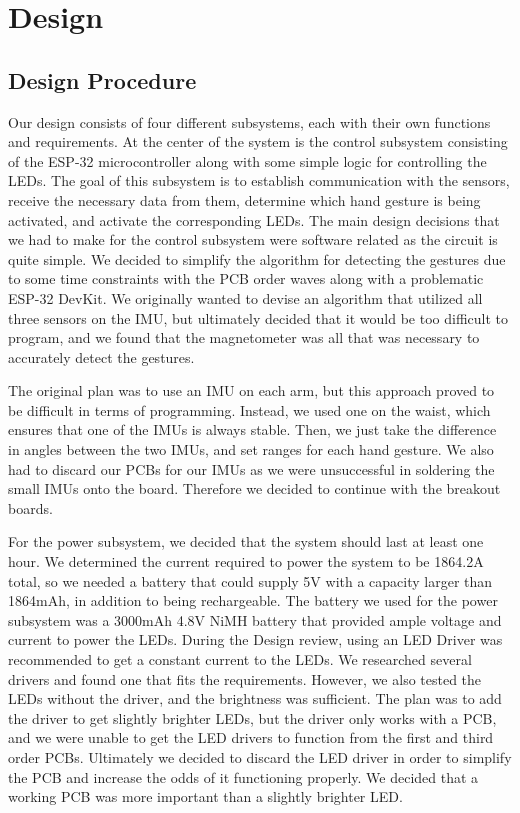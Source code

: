 \section{Design}

\subsection{Design Procedure}
Our design consists of four different subsystems, each with their own functions and requirements. At the center of the system is the control subsystem consisting of the ESP-32 microcontroller along with some simple logic for controlling the LEDs. The goal of this subsystem is to establish communication with the sensors, receive the necessary data from them, determine which hand gesture is being activated, and activate the corresponding LEDs. The main design decisions that we had to make for the control subsystem were software related as the circuit is quite simple. We decided to simplify the algorithm for detecting the gestures due to some time constraints with the PCB order waves along with a problematic ESP-32 DevKit. We originally wanted to devise an algorithm that utilized all three sensors on the IMU, but ultimately decided that it would be too difficult to program, and we found that the magnetometer was all that was necessary to accurately detect the gestures.

The original plan was to use an IMU on each arm, but this approach proved to be difficult in terms of programming. Instead, we used one on the waist, which ensures that one of the IMUs is always stable. Then, we just take the difference in angles between the two IMUs, and set ranges for each hand gesture. We also had to discard our PCBs for our IMUs as we were unsuccessful in soldering the small IMUs onto the board. Therefore we decided to continue with the breakout boards. 

For the power subsystem, we decided that the system should last at least one hour. We determined the current required to power the system to be 1864.2A total, so we needed a battery that could supply 5V with a capacity larger than 1864mAh, in addition to being rechargeable. The battery we used for the power subsystem was a 3000mAh 4.8V NiMH battery that provided ample voltage and current to power the LEDs. During the Design review, using an LED Driver was recommended to get a constant current to the LEDs. We researched several drivers and found one that fits the requirements. However, we also tested the LEDs without the driver, and the brightness was sufficient. The plan was to add the driver to get slightly brighter LEDs, but the driver only works with a PCB, and we were unable to get the LED drivers to function from the first and third order PCBs. Ultimately we decided to discard the LED driver in order to simplify the PCB and increase the odds of it functioning properly. We decided that a working PCB was more important than a slightly brighter LED.

